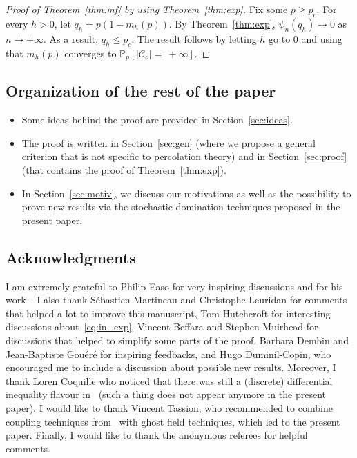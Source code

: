 \documentclass[AHL,Unicode,longabstracts,published]{cedram}
\newcommand{\Pro}{\mathbb{P}}
\newcommand{\calC}{\mathcal{C}}
\begin{document}
\begin{proof}[Proof of Theorem~\ref{thm:mf} by using Theorem~\ref{thm:exp}]
Fix some $p\ge p_c$. For every $h>0$, let $q_h=p(1-m_h(p))$. By Theorem~\ref{thm:exp}, $\psi_n(q_h)\rightarrow 0$ as $n\rightarrow+\infty$. As a result, $q_h\le p_c$. The result follows by letting $h$ go to $0$ and using that $m_h(p)$ converges to $\Pro_p[|\calC_o|=~+\infty]$.
\end{proof}



\subsection*{Organization of the rest of the paper}
\begin{itemize}
\item Some ideas behind the proof are provided in Section~\ref{sec:ideas}.
\item The proof is written in Section~\ref{sec:gen} (where we propose a general criterion that is not specific to percolation theory) and in Section~\ref{sec:proof} (that contains the proof of Theorem~\ref{thm:exp}).
\item In Section~\ref{sec:motiv}, we discuss our motivations as well as the possibility to prove new results via the stochastic domination techniques proposed in the present paper.
\end{itemize}

\subsection*{Acknowledgments}
I am extremely grateful to Philip Easo for very inspiring discussions and for his work~\cite{Eas22}. I also thank Sébastien Martineau and Christophe Leuridan for comments that helped a lot to improve this manuscript, Tom Hutchcroft for interesting discussions about~\eqref{eq:in_exp}, Vincent Beffara and Stephen Muirhead for discussions that helped to simplify some parts of the proof, Barbara Dembin and Jean-Baptiste Gouéré for inspiring feedbacks, and Hugo Duminil-Copin, who encouraged me to include a discussion about possible new results. Moreover, I thank Loren Coquille who noticed that there was still a (discrete) differential inequality flavour in~\cite{Van22} (such a thing does not appear anymore in the present paper). I would like to thank Vincent Tassion, who recommended to combine coupling techniques from~\cite{Eas22,Van22} with ghost field techniques, which led to the present paper. Finally, I would like to thank the anonymous referees for helpful comments.
\end{document}
